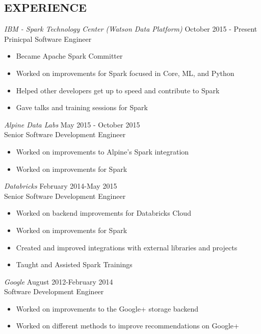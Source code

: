 \documentclass[10pt,line,margin=0.1]{newsres}
\begin{document}
\begin{resume}
\section{EXPERIENCE}
        {\sl IBM - Spark Technology Center (Watson Data Platform)} \hfill October 2015 - Present\\
        Prinicpal Software Engineer
        \begin{itemize}  \itemsep -2pt %
          \item Became Apache Spark Committer
          \item Worked on improvements for Spark focused in Core, ML, and Python
          \item Helped other developers get up to speed and contribute to Spark
          \item Gave talks and training sessions for Spark
        \end{itemize}
        {\sl Alpine Data Labs} \hfill May 2015 - October 2015\\
        Senior Software Development Engineer
        \begin{itemize}  \itemsep -2pt %
          \item Worked on improvements to Alpine's Spark integration
          \item Worked on improvements for Spark
        \end{itemize}
      {\sl Databricks} \hfill February 2014-May 2015\\
        Senior Software Development Engineer
        \begin{itemize}  \itemsep -2pt %
          \item Worked on backend improvements for Databricks Cloud
          \item Worked on improvements for Spark
          \item Created and improved integrations with external libraries and projects
          \item Taught and Assisted Spark Trainings
        \end{itemize}
        {\sl Google} \hfill August 2012-February 2014\\
        Software Development Engineer
        \begin{itemize}  \itemsep -2pt %
          \item Worked on improvements to the Google+ storage backend
          \item Worked on different methods to improve recommendations on Google+

\end{itemize}
\end{resume}
\end{document}
